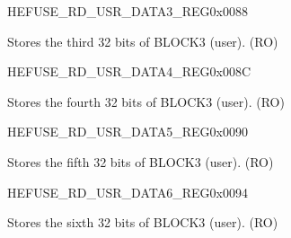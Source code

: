 \begin{register}{H}{EFUSE\_RD\_USR\_DATA3\_REG}{0x0088}\label{regdesc:EFUSERDUSRDATA3REG}
%
\regnewline%
\begin{regdesc}\begin{reglist}
\label{fielddesc:EFUSEUSRDATA3}\item [EFUSE\_USR\_DATA3] Stores the third 32 bits of BLOCK3 (user). (RO)
\end{reglist}\end{regdesc}
\end{register}


\begin{register}{H}{EFUSE\_RD\_USR\_DATA4\_REG}{0x008C}\label{regdesc:EFUSERDUSRDATA4REG}
%
\regnewline%
\begin{regdesc}\begin{reglist}
\label{fielddesc:EFUSEUSRDATA4}\item [EFUSE\_USR\_DATA4] Stores the fourth 32 bits of BLOCK3 (user). (RO)
\end{reglist}\end{regdesc}
\end{register}


\begin{register}{H}{EFUSE\_RD\_USR\_DATA5\_REG}{0x0090}\label{regdesc:EFUSERDUSRDATA5REG}
%
\regnewline%
\begin{regdesc}\begin{reglist}
\label{fielddesc:EFUSEUSRDATA5}\item [EFUSE\_USR\_DATA5] Stores the fifth 32 bits of BLOCK3 (user). (RO)
\end{reglist}\end{regdesc}
\end{register}


\begin{register}{H}{EFUSE\_RD\_USR\_DATA6\_REG}{0x0094}\label{regdesc:EFUSERDUSRDATA6REG}
%
\regnewline%
\begin{regdesc}\begin{reglist}
\label{fielddesc:EFUSEUSRDATA6}\item [EFUSE\_USR\_DATA6] Stores the sixth 32 bits of BLOCK3 (user). (RO)
\end{reglist}\end{regdesc}
\end{register}


